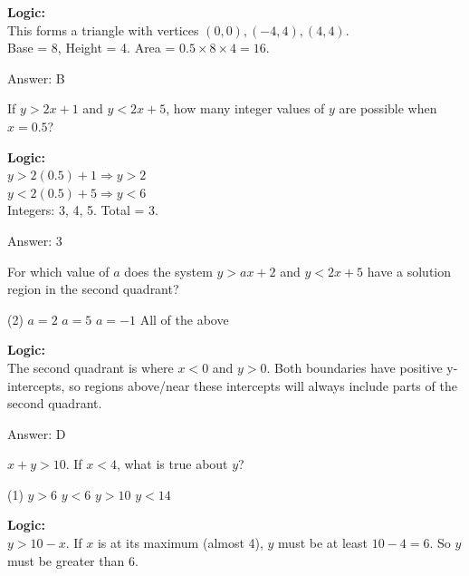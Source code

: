 \documentclass[11pt,paper=a4,answers]{exam}
\begin{document}
\begin{questions}
\begin{solution}
\textbf{Logic:} \\
This forms a triangle with vertices $(0,0), (-4,4), (4,4)$. \\
Base = 8, Height = 4. Area = $0.5 \times 8 \times 4 = 16$.

\vspace{15pt}
Answer: \colorbox{yellow!100}{B}
\end{solution}

\question
If $y > 2x + 1$ and $y < 2x + 5$, how many integer values of $y$ are possible when $x = 0.5$?

\begin{solution}
\textbf{Logic:} \\
$y > 2(0.5) + 1 \Rightarrow y > 2$ \\
$y < 2(0.5) + 5 \Rightarrow y < 6$ \\
Integers: 3, 4, 5. Total = 3.

\vspace{15pt}
Answer: \colorbox{yellow!100}{3}
\end{solution}

\question
For which value of $a$ does the system $y > ax + 2$ and $y < 2x + 5$ have a solution region in the second quadrant?
\begin{tasks}(2)
    \task $a = 2$
    \task $a = 5$
    \task $a = -1$
    \task All of the above
\end{tasks}

\begin{solution}
\textbf{Logic:} \\
The second quadrant is where $x < 0$ and $y > 0$. Both boundaries have positive y-intercepts, so regions above/near these intercepts will always include parts of the second quadrant.

\vspace{15pt}
Answer: \colorbox{yellow!100}{D}
\end{solution}

\question
$x + y > 10$. If $x < 4$, what is true about $y$?
\begin{tasks}(1)
    \task $y > 6$
    \task $y < 6$
    \task $y > 10$
    \task $y < 14$
\end{tasks}

\begin{solution}
\textbf{Logic:} \\
$y > 10 - x$. If $x$ is at its maximum (almost 4), $y$ must be at least $10 - 4 = 6$. So $y$ must be greater than 6.


\end{solution}
\end{questions}
\end{document}
